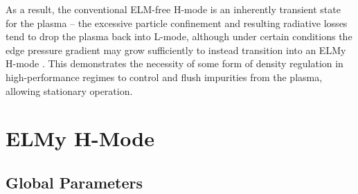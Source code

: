As a result, the conventional ELM-free H-mode is an inherently transient state for the plasma -- the excessive particle confinement and resulting radiative losses tend to drop the plasma back into L-mode, although under certain conditions the edge pressure gradient may grow sufficiently to instead transition into an ELMy H-mode \cite{Breger1998}.  This demonstrates the necessity of some form of density regulation in high-performance regimes to control and flush impurities from the plasma, allowing stationary operation.\nicesectionending

\section{ELMy H-Mode}\label{sec:hcr_elmy}

\subsection{Global Parameters}\label{subsec:hcr_elmy_ped}

\begin{figure}
 \pushtooutside
\end{figure}

